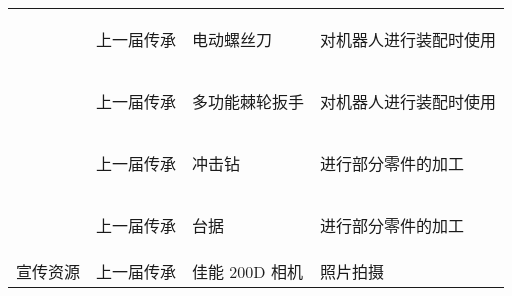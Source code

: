 \begin{longtable}{ X | X | X | X }
    \cline{2-4}

    &
        \begin{center}
            上一届传承
        \end{center}&
        \begin{center}
            电动螺丝刀
        \end{center}&
        \begin{center}
            对机器人进行装配时使用
        \end{center}\\
    
    \cline{2-4}

    &
        \begin{center}
            上一届传承
        \end{center}&
        \begin{center}
            多功能棘轮扳手
        \end{center}&
        \begin{center}
            对机器人进行装配时使用
        \end{center}\\
    
    \cline{2-4}

    &
        \begin{center}
            上一届传承
        \end{center}&
        \begin{center}
            冲击钻
        \end{center}&
        \begin{center}
            进行部分零件的加工
        \end{center}\\
    
    \cline{2-4}

    &
        \begin{center}
            上一届传承
        \end{center}&
        \begin{center}
            台据
        \end{center}&
        \begin{center}
            进行部分零件的加工
        \end{center}\\
    
    \hline
    
        \multirow{2}{*}{宣传资源} &
        上一届传承 &
        佳能 200D 相机 &
        照片拍摄 \\


\end{longtable}
